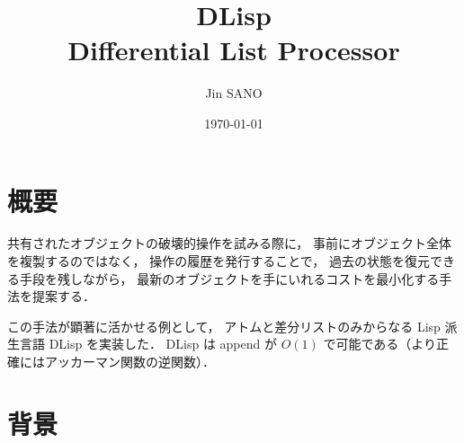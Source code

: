 \documentclass[10pt, a4j, twocolumn]{scrartcl}
\author{Jin SANO}
\date{\today}
\title{DLisp\\\medskip
\large Differential List Processor}
\begin{document}
\maketitle
\tableofcontents




\section{概要}
\label{sec:orgc60b104}

共有されたオブジェクトの破壊的操作を試みる際に，
事前にオブジェクト全体を複製するのではなく，
操作の履歴を発行することで，
過去の状態を復元できる手段を残しながら，
最新のオブジェクトを手にいれるコストを最小化する手法を提案する．

この手法が顕著に活かせる例として，
アトムと差分リストのみからなる Lisp 派生言語 DLisp を実装した．
DLisp は append が \(O(1)\) で可能である（より正確にはアッカーマン関数の逆関数）．


\section{背景}
\label{sec:org012b795}
\end{document}
